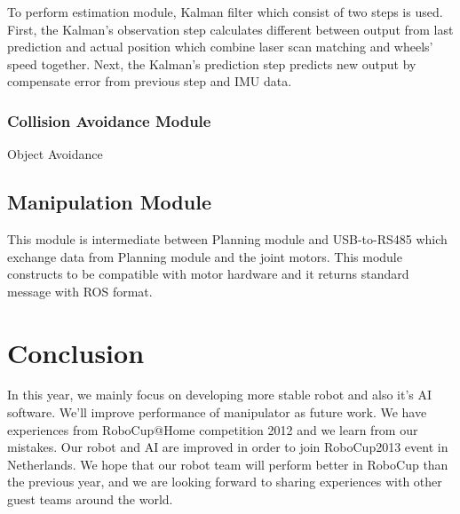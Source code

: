 \documentclass{llncs}
\begin{document}
To perform estimation module, Kalman filter which consist of two steps is used. First, the Kalman's observation step calculates different between output from last prediction and actual position which combine laser scan matching and wheels' speed together. Next, the Kalman's prediction step predicts new output by compensate error from previous step and IMU data.

\subsubsection{Collision Avoidance Module}

Object Avoidance

\subsection{Manipulation Module}

This module is intermediate between Planning module and USB-to-RS485 which exchange data from Planning module and the joint motors. This module constructs to be compatible with motor hardware and it returns standard message with ROS format.

\section{Conclusion}

In this year, we mainly focus on developing more stable robot and also it's AI software. We'll improve performance of manipulator as future work. We have experiences from RoboCup@Home competition 2012 and we learn from our mistakes. Our robot and AI are improved in order to join RoboCup2013 event in Netherlands. We hope that our robot team will perform better in RoboCup than the previous year, and we are looking forward to sharing experiences with other guest teams around the world.
\end{document}

